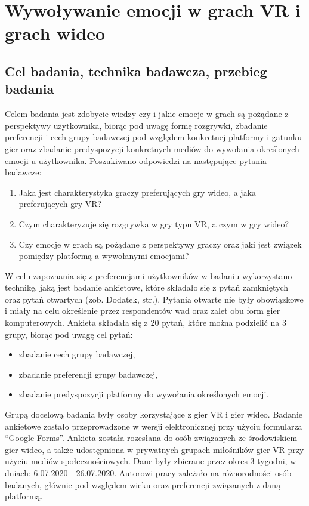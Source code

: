 \chapter{Wywoływanie emocji w grach VR i grach wideo}
\label{chap:czwarty}

\section{Cel badania, technika badawcza, przebieg badania}

Celem badania jest zdobycie wiedzy czy i jakie emocje w grach są pożądane z perspektywy użytkownika, biorąc pod uwagę formę rozgrywki, zbadanie  preferencji i cech grupy badawczej pod względem konkretnej platformy i gatunku gier oraz zbadanie predyspozycji konkretnych mediów do wywołania określonych emocji u użytkownika. Poszukiwano odpowiedzi na następujące pytania badawcze:

\begin{enumerate}
   \item Jaka jest charakterystyka graczy preferujących gry wideo, a jaka preferujących gry VR?
   \item Czym charakteryzuje się rozgrywka w gry typu VR, a czym w gry wideo?
   \item Czy emocje w grach są pożądane z perspektywy graczy oraz jaki jest związek pomiędzy platformą a wywołanymi emocjami?
\end{enumerate}

W celu zapoznania się z preferencjami użytkowników w badaniu wykorzystano technikę, jaką jest badanie ankietowe, które składało się z pytań zamkniętych oraz pytań otwartych (zob. Dodatek, str.\pageref{chap:dodatek}). Pytania otwarte nie były obowiązkowe i miały na celu określenie przez respondentów wad oraz zalet obu form gier komputerowych. Ankieta składała się z 20 pytań, które można podzielić na 3 grupy, biorąc pod uwagę cel pytań:
\begin{itemize}
  \item zbadanie cech grupy badawczej,
  \item zbadanie preferencji grupy badawczej,
  \item zbadanie predyspozycji platformy do wywołania określonych emocji.
\end{itemize}

Grupą docelową badania były osoby korzystające z gier VR i gier wideo. Badanie ankietowe zostało przeprowadzone w wersji elektronicznej przy użyciu formularza ``Google Forms''. Ankieta została rozesłana do osób związanych ze środowiskiem gier wideo, a także udostępniona w prywatnych grupach miłośników gier VR przy użyciu mediów społecznościowych. Dane były zbierane przez okres 3 tygodni, w dniach:  6.07.2020 - 26.07.2020. Autorowi pracy zależało na różnorodności osób badanych, głównie pod względem wieku oraz preferencji związanych z daną platformą.

